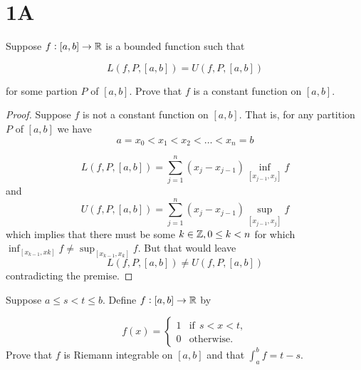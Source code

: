 \documentclass[../main]{subfiles}
\begin{document}
\maketitle

\section{1A}

\begin{problem}{1}
Suppose $f:[a,b] \rightarrow \mathbb{R}$ is a bounded function such that

\[L(f, P, [a,b]) = U(f,P,[a,b])\]

for some partion $P$ of $[a,b]$. Prove that $f$ is a constant function on $[a,b]$.

\end{problem}
\begin{proof}
Suppose $f$ is not a constant function on $[a,b]$. That is, for any partition $P$ of $[a,b]$ we have
\[a=x_0<x_1<x_2<\ldots<x_n=b\]

\[L(f,P,[a,b]) = \sum_{j=1}^{n}(x_j-x_{j-1})\inf_{[x_{j-1},x_{j}]}f\]
and
\[U(f,P,[a,b]) = \sum_{j=1}^{n}(x_j-x_{j-1})\sup_{[x_{j-1},x_{j}]}f\]
which implies that there must be some $k\in\mathbb{Z}, 0\leq k<n$ for which $\inf_{[x_{k-1},x{k}]}f\ne\sup_{[x_{k-1},x_{k}]}f$. But that would leave
\[L(f, P, [a,b]) \ne U(f,P,[a,b])\]
contradicting the premise.
\end{proof}

\begin{problem}{2}
	Suppose $a\leq s<t\leq b$. Define $f:[a,b]\rightarrow \mathbb{R}$ by

	\[f(x)=\begin{cases}
		1 &\text{if} ~~ s<x<t,\\
		0 &\text{otherwise.}
	\end{cases}\]
Prove that $f$ is Riemann integrable on $[a,b]$ and that $\int_a^bf = t - s.$
\end{problem}
\end{document}
